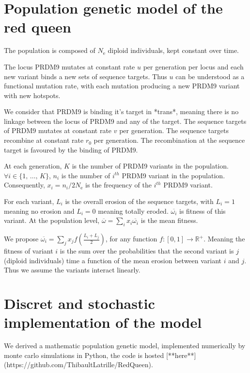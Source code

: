 \documentclass{article}
\begin{document}
\section{Population genetic model of the red queen}


The population is composed of $N_\mathrm{e}$ diploid individuals, kept constant over time.


The locus PRDM9 mutates at constant rate $u$ per generation per locus and each new variant binds a new sets of sequence targets. Thus $u$ can be understood as a functional mutation rate, with each mutation producing a new PRDM9 variant with new hotspots.


We consider that PRDM9 is binding it's target in *trans*, meaning there is no linkage between the locus of PRDM9 and any of the target. The sequence targets of PRDM9 mutates at constant rate $v$ per generation. The sequence targets recombine at constant rate $r_0$ per generation. The recombination at the sequence target is favoured by the binding of PRDM9.


At each generation, $K$ is the number of PRDM9 variants in the population. $\forall i \in \{ 1, \, \dots, \, K \}$, $n_i$ is the number of $i^{th}$ PRDM9 variant in the population. Consequently, $x_i = n_i / 2 N_\mathrm{e}$ is the frequency of the $i^{th}$ PRDM9 variant.


For each variant, $L_i$ is the overall erosion of the sequence targets, with $L_i=1$ meaning no erosion and $L_i=0$ meaning totally eroded. $\overline{\omega_i}$ is fitness of this variant. At the population level, $\overline{\omega}=\sum_{i} x_i \overline{\omega_i}$ is the mean fitness.

We propose $\overline{\omega_i}=\sum_j x_j f \left( \tfrac{L_i + L_j}{2} \right)$, for any function $f\colon [0,1] \rightarrow \mathbb{R}^+$. Meaning the fitness of variant $i$ is the sum over the probabilities that the second variant is $j$ (diploid individuals) time a function of the mean erosion between variant $i$ and $j$. Thus we assume the variants interact linearly.


\section{Discret and stochastic implementation of the model} 

We derived a mathematic population genetic model, implemented numerically by monte carlo simulations in Python, the code is hosted [**here**](https://github.com/ThibaultLatrille/RedQueen).
\end{document}
